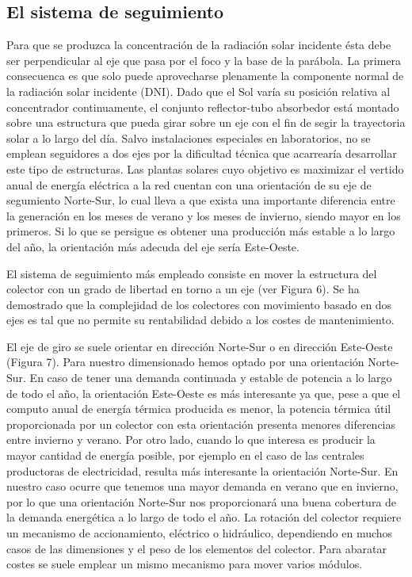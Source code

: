 \subsection{El sistema de seguimiento}
\label{sistemadeseguimiento}
Para que se produzca la concentración de la radiación solar incidente ésta debe ser perpendicular al eje que pasa por el foco y la base de la parábola. La primera consecuenca es que solo puede aprovecharse plenamente la componente normal de la radiación solar incidente (DNI). Dado que el Sol varía su posición relativa al concentrador continuamente, el conjunto reflector-tubo absorbedor está montado sobre una estructura que pueda girar sobre un eje con el fin de segir la trayectoria solar a lo largo del día. Salvo instalaciones especiales en laboratorios, no se emplean seguidores a dos ejes por la dificultad técnica que acarrearía desarrollar este tipo de estructuras. Las plantas solares cuyo objetivo es maximizar el vertido anual de energía eléctrica a la red cuentan con una orientación de su eje de segumiento Norte-Sur, lo cual lleva a que exista una importante diferencia entre la generación en los meses de verano y los meses de invierno, siendo mayor en los primeros. Si lo que se persigue es obtener una producción más estable a lo largo del año, la orientación más adecuda del eje sería Este-Oeste.

El sistema de seguimiento más empleado consiste en mover la estructura del colector con un grado
de libertad en torno a un eje (ver Figura 6). Se ha demostrado que la complejidad de los colectores
con movimiento basado en dos ejes es tal que no permite su rentabilidad debido a los costes de
mantenimiento.

El eje de giro se suele orientar en dirección Norte-Sur o en dirección Este-Oeste (Figura 7). Para
nuestro dimensionado hemos optado por una orientación Norte-Sur. En caso de tener una demanda
continuada y estable de potencia a lo largo de todo el año, la orientación Este-Oeste es más
interesante ya que, pese a que el computo anual de energía térmica producida es menor, la potencia
térmica útil proporcionada por un colector con esta orientación presenta menores diferencias entre
invierno y verano. Por otro lado, cuando lo que interesa es producir la mayor cantidad de energía
posible, por ejemplo en el caso de las centrales productoras de electricidad, resulta más interesante
la orientación Norte-Sur. En nuestro caso ocurre que tenemos una mayor demanda en verano que en
invierno, por lo que una orientación Norte-Sur nos proporcionará una buena cobertura de la
demanda energética a lo largo de todo el año.
La rotación del colector requiere un mecanismo de accionamiento, eléctrico o hidráulico,
dependiendo en muchos casos de las dimensiones y el peso de los elementos del colector. Para
abaratar costes se suele emplear un mismo mecanismo para mover varios módulos.

